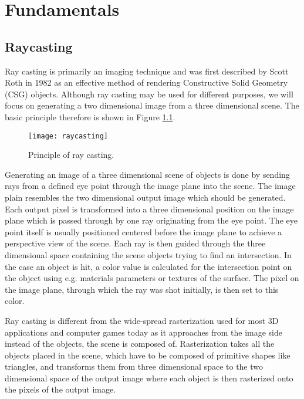 \chapter{Fundamentals}
\label{sec:fundamentals}

\section{Raycasting}

Ray casting is primarily an imaging technique and was first described by Scott Roth in 1982 as an effective method of rendering Constructive Solid Geometry (CSG) objects. Although ray casting may be used for different purposes, we will focus on generating a two dimensional image from a three dimensional scene. The basic principle therefore is shown in Figure \ref{fig:raycasting}. 

\begin{figure}[h]
\centering
\texttt{[image: raycasting]}
\caption{Principle of ray casting.}
\label{fig:raycasting}
\end{figure}

Generating an image of a three dimensional scene of objects is done by sending rays from a defined eye point through the image plane into the scene. The image plain resembles the two dimensional output image which should be generated. Each output pixel is transformed into a three dimensional position on the image plane which is passed through by one ray originating from the eye point. The eye point itself is usually positioned centered before the image plane to achieve a perspective view of the scene. Each ray is then guided through the three dimensional space containing the scene objects trying to find an intersection. In the case an object is hit, a color value is calculated for the intersection point on the object using e.g. materials parameters or textures of the surface. The pixel on the image plane, through which the ray was shot initially, is then set to this color.

Ray casting is different from the wide-spread rasterization used for most 3D applications and computer games today as it approaches from the image side instead of the objects, the scene is composed of. Rasterization takes all the objects placed in the scene, which have to be composed of primitive shapes like triangles, and transforms them from three dimensional space to the two dimensional space of the output image where each object is then rasterized onto the pixels of the output image.

